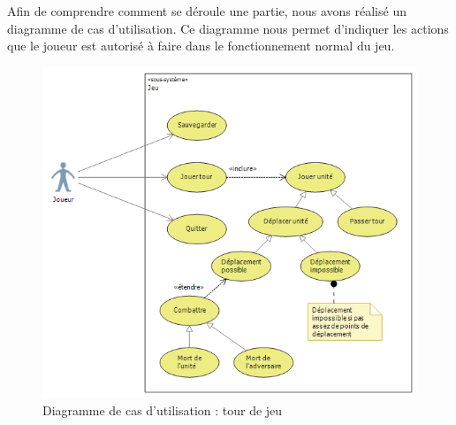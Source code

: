 Afin de comprendre comment se déroule  une partie, nous avons réalisé un diagramme de cas d'utilisation. Ce diagramme nous permet d'indiquer les actions que le joueur est autorisé à faire dans le fonctionnement normal du jeu.
\begin{figure}[!h]
\centering
\includegraphics[width=\textwidth]{Parties/Images/cdu_TourDeJeu.png}
\caption{Diagramme de cas d'utilisation : tour de jeu}
\label{fig:cdu_TourDeJeu}
\end{figure}
